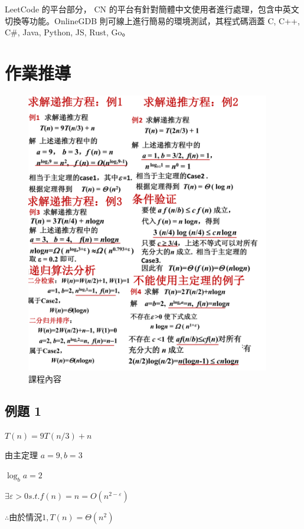 \documentclass[10pt,UTF8]{ctexart}
\begin{document}
LeetCode 的平台部分， CN 的平台有針對簡體中文使用者進行處理，包含中英文切換等功能。OnlineGDB 則可線上進行簡易的環境測試，其程式碼涵蓋 C, C++, C\#, Java, Python, JS, Rust, Go。

\newpage

\section{作業推導}

\begin{figure}[H]
\centering 
\includegraphics[width=0.95\textwidth]{w14-kp-27.png} 
\caption{課程內容}
\label{Test}
\end{figure}

\subsection{例題 1}

$T(n) =  9T(n/3) + n$

由主定理 $a = 9, b = 3$

$\log_b a = 2 $

$\exists  \varepsilon > 0 s.t. f(n) = n = O(n^{2 - \varepsilon})$

$\therefore 由於情況 1, T(n) = \Theta(n^{2}) $
\end{document}

